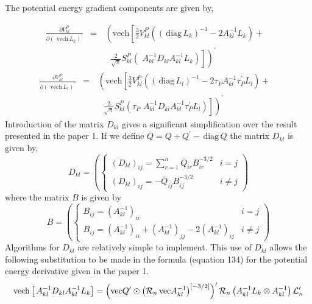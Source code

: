 \documentclass[12pt,thmsa,suthesis,verbatim]{report}
\begin{document}
The potential energy gradient components are given by,

\begin{eqnarray}
\frac{\partial V_{kl}^P}{\partial \left( \,\,\mathrm{vech}\,L_k\right)
^{\prime }} &=&\,\left( \mathrm{vech}\left[ \frac 32V_{kl}^P\left( \left( \,%
\mathrm{diag}\,L_k\right) ^{-1}-2A_{kl}^{-1}L_k\right) + 
\begin{array}{c}
\end{array}
\right. \right.  \nonumber \\
&&\left. \left. 
\begin{array}{c}
\end{array}
\frac 2{\sqrt{\pi }}S_{kl}^P\left(
\,\,A_{kl}^{-1}D_{kl}A_{kl}^{-1}L_k\right) \right] \right) ^{\prime }
\end{eqnarray}
\begin{eqnarray}
\frac{\partial V_{kl}^P}{\partial \left( \,\,\mathrm{vech}\,L_l\right)
^{\prime }} &=&\,\left( \mathrm{vech}\left[ \frac 32V_{kl}^P\left( \left( \,%
\mathrm{diag}\,L_l\right) ^{-1}-2\tau _PA_{kl}^{-1}\tau _P^{\prime
}L_l\right) + 
\begin{array}{c}
\end{array}
\right. \right.  \nonumber \\
&&\left. \left. 
\begin{array}{c}
\end{array}
\frac 2{\sqrt{\pi }}S_{kl}^P\left( \tau
_P\,\,A_{kl}^{-1}D_{kl}A_{kl}^{-1}\tau _P^{\prime }L_l\right) \right]
\right) ^{\prime }
\end{eqnarray}
Introduction of the matrix $D_{kl}$ gives a significant simplification over
the result presented in the paper 1. If we define $\bar{Q}=Q+Q^{\prime }-\,%
\mathrm{diag}\,Q$ the matrix $D_{kl}$ is given by, 
\begin{equation}
D_{kl}=\left( \left\{ 
\begin{array}{ll}
\left( D_{kl}\right) _{ij}=\sum_{r=1}^n\bar{Q}_{ir}B_{ir}^{-3/2} & i=j \\ 
\left( D_{kl}\right) _{ij}=-\bar{Q}_{ij}B_{ij}^{-3/2} & i\neq j
\end{array}
\right. \right)
\end{equation}
where the matrix $B$ is given by 
\begin{equation}
B=\left( \left\{ 
\begin{array}{ll}
B_{ij}=\left( A_{kl}^{-1}\right) _{ii} & i=j \\ 
B_{ij}=\left( A_{kl}^{-1}\right) _{ii}+\left( A_{kl}^{-1}\right)
_{jj}-2\left( A_{kl}^{-1}\right) _{ij} & i\neq j
\end{array}
\right. \right)
\end{equation}
Algorithms for $D_{kl}$ are relatively simple to implement. This use of $%
D_{kl}$ allows the following substitution to be made in the formula
(equation 134) for the potential energy derivative given in the paper 1. 
\begin{equation}
\mathrm{vech}\left[ \,A_{kl}^{-1}D_{kl}A_{kl}^{-1}L_k\right] =\left( \mathrm{%
vec}Q^{\prime }\odot \left( \mathcal{R}_n\,\mathrm{vec}A_{kl}^{-1}\right)
^{\left[ -3/2\right] }\right) ^{\prime }\mathcal{R}_n\left(
A_{kl}^{-1}L_k\otimes A_{kl}^{-1}\right) \mathcal{L}_n^{\prime }
\end{equation}
\end{document}
